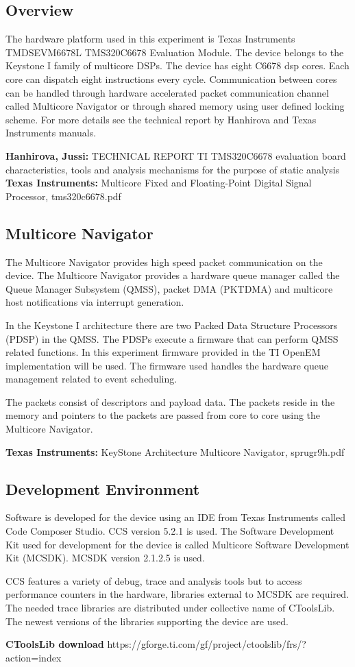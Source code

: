 \subsection{Overview}
The hardware platform used in this experiment is Texas Instruments TMDSEVM6678L TMS320C6678 Evaluation Module. The device belongs to the Keystone I family of multicore DSPs. The device has eight C6678 dsp cores. Each core can dispatch eight instructions every cycle. Communication between cores can be handled through hardware accelerated packet communication channel called Multicore Navigator or through shared memory using user defined locking scheme. For more details see the technical report by Hanhirova and Texas Instruments manuals.

\textbf{Hanhirova, Jussi:} TECHNICAL REPORT TI TMS320C6678 evaluation board characteristics, tools and analysis mechanisms for the purpose of static analysis\\
\textbf{Texas Instruments:} Multicore Fixed and Floating-Point Digital Signal Processor, tms320c6678.pdf

\subsection{Multicore Navigator}\label{navigator}
The Multicore Navigator provides high speed packet communication on the device. The Multicore Navigator provides a hardware queue manager called the Queue Manager Subsystem (QMSS), packet DMA (PKTDMA) and multicore host notifications via interrupt generation.

In the Keystone I architecture there are two Packed Data Structure Processors (PDSP) in the QMSS. The PDSPs execute a firmware that can perform QMSS related functions. In this experiment firmware provided in the TI OpenEM implementation will be used. The firmware used handles the hardware queue management related to event scheduling.

The packets consist of descriptors and payload data. The packets reside in the memory and pointers to the packets are passed from core to core using the Multicore Navigator.

\textbf{Texas Instruments:} KeyStone Architecture Multicore Navigator, sprugr9h.pdf

\subsection{Development Environment}\label{MCSDK}
Software is developed for the device using an IDE from Texas Instruments called Code Composer Studio. CCS version 5.2.1 is used. The Software Development Kit used for development for the device is called Multicore Software Development Kit (MCSDK). MCSDK version 2.1.2.5 is used.

CCS features a variety of debug, trace and analysis tools but to access performance counters in the hardware, libraries external to MCSDK are required. The needed trace libraries are distributed under collective name of CToolsLib. The newest versions of the libraries supporting the device are used.

\textbf{CToolsLib download} https://gforge.ti.com/gf/project/ctoolslib/frs/?action=index
